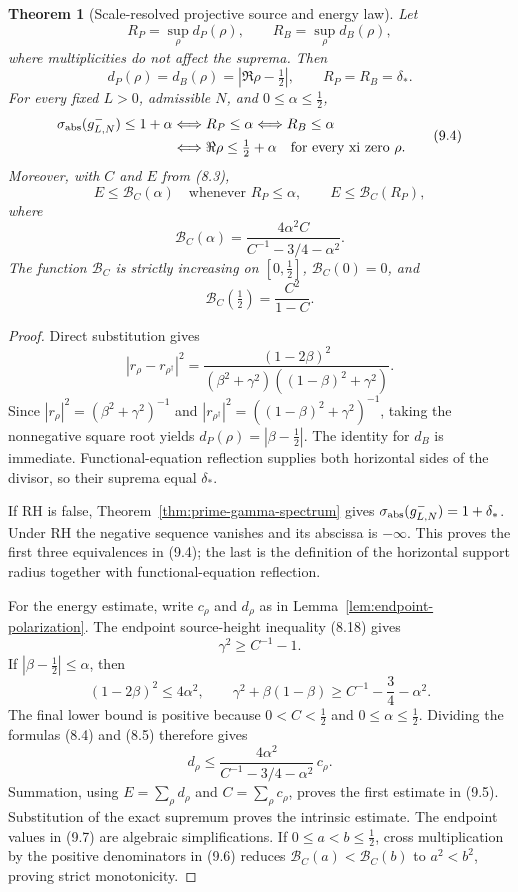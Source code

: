 \documentclass[11pt]{article}
\newtheorem{theorem}{Theorem}[section]
\begin{document}
\begin{theorem}[Scale-resolved projective source and energy law]
\label{thm:projective-energy-budget}
Let
\[
 R_P=\sup_\rho d_P(\rho),\qquad R_B=\sup_\rho d_B(\rho),
 \tag{9.2}
\]
where multiplicities do not affect the suprema.  Then
\[
 d_P(\rho)=d_B(\rho)=|\Re\rho-\tfrac12|,
 \qquad R_P=R_B=\delta_*.
 \tag{9.3}
\]
For every fixed $L>0$, admissible $N$, and $0\le\alpha\le\frac12$,
\[
 \begin{aligned}
 \sigma_{\rm abs}(g_{L,N}^-)\le1+\alpha
 &\Longleftrightarrow R_P\le\alpha
 \Longleftrightarrow R_B\le\alpha\\
 &\Longleftrightarrow
 \Re\rho\le\tfrac12+\alpha
 \quad\text{for every xi zero }\rho.
 \end{aligned}
 \tag{9.4}
\]
Moreover, with $C$ and $E$ from \textup{(8.3)},
\[
 E\le\mathcal B_C(\alpha)\quad\text{whenever }R_P\le\alpha,
 \qquad
 E\le\mathcal B_C(R_P),
 \tag{9.5}
\]
where
\[
 \mathcal B_C(\alpha)=
 \frac{4\alpha^2C}{C^{-1}-3/4-\alpha^2}.
 \tag{9.6}
\]
The function $\mathcal B_C$ is strictly increasing on $[0,\frac12]$,
$\mathcal B_C(0)=0$, and
\[
 \mathcal B_C(\tfrac12)=\frac{C^2}{1-C}.
 \tag{9.7}
\]
\end{theorem}

\begin{proof}
Direct substitution gives
\[
 |r_\rho-r_{\rho^\dagger}|^2
 =\frac{(1-2\beta)^2}
 { (\beta^2+\gamma^2)((1-\beta)^2+\gamma^2)}.
\]
Since
$|r_\rho|^2=(\beta^2+\gamma^2)^{-1}$ and
$|r_{\rho^\dagger}|^2=((1-\beta)^2+\gamma^2)^{-1}$, taking the nonnegative square root yields
$d_P(\rho)=|\beta-\frac12|$.  The identity for $d_B$ is immediate.  Functional-equation
reflection supplies both horizontal sides of the divisor, so their suprema equal $\delta_*$.

If RH is false, Theorem~\ref{thm:prime-gamma-spectrum} gives
$\sigma_{\rm abs}(g_{L,N}^-)=1+\delta_*$.  Under RH the negative sequence vanishes and its
abscissa is $-\infty$.  This proves the first three equivalences in \textup{(9.4)}; the last is
the definition of the horizontal support radius together with functional-equation reflection.

For the energy estimate, write $c_\rho$ and $d_\rho$ as in
Lemma~\ref{lem:endpoint-polarization}.  The endpoint source-height inequality
\textup{(8.18)} gives
\[
 \gamma^2\ge C^{-1}-1.
 \tag{9.8}
\]
If $|\beta-\frac12|\le\alpha$, then
\[
 (1-2\beta)^2\le4\alpha^2,
 \qquad
 \gamma^2+\beta(1-\beta)
 \ge C^{-1}-\frac34-\alpha^2.
 \tag{9.9}
\]
The final lower bound is positive because $0<C<\frac12$ and
$0\le\alpha\le\frac12$.  Dividing the formulas \textup{(8.4)} and \textup{(8.5)} therefore gives
\[
 d_\rho\le
 \frac{4\alpha^2}{C^{-1}-3/4-\alpha^2}\,c_\rho.
 \tag{9.10}
\]
Summation, using $E=\sum_\rho d_\rho$ and $C=\sum_\rho c_\rho$, proves the first estimate in
\textup{(9.5)}.  Substitution of the exact supremum proves the intrinsic estimate.  The endpoint
values in \textup{(9.7)} are algebraic simplifications.  If $0\le a<b\le\frac12$, cross
multiplication by the positive denominators in \textup{(9.6)} reduces
$\mathcal B_C(a)<\mathcal B_C(b)$ to $a^2<b^2$, proving strict monotonicity.
\end{proof}
\end{document}
